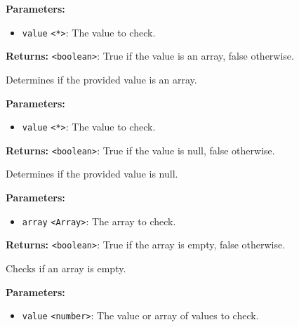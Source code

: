 \documentclass[12pt,a4paper]{article}
\begin{document}
\vspace{5mm}
\noindent {}


\noindent \textbf{Parameters:}
\begin{itemize}
  \item \texttt{value} \texttt{<*>}: The value to check.
\end{itemize}

\noindent \textbf{Returns:} \texttt{<boolean>}: True if the value is an array, false otherwise.

\noindent Determines if the provided value is an array.

\vspace{5mm}
\noindent {}


\noindent \textbf{Parameters:}
\begin{itemize}
  \item \texttt{value} \texttt{<*>}: The value to check.
\end{itemize}

\noindent \textbf{Returns:} \texttt{<boolean>}: True if the value is null, false otherwise.

\noindent Determines if the provided value is null.

\vspace{5mm}
\noindent {}


\noindent \textbf{Parameters:}
\begin{itemize}
  \item \texttt{array} \texttt{<Array>}: The array to check.
\end{itemize}

\noindent \textbf{Returns:} \texttt{<boolean>}: True if the array is empty, false otherwise.

\noindent Checks if an array is empty.

\vspace{5mm}
\noindent {}


\noindent \textbf{Parameters:}
\begin{itemize}
  \item \texttt{value} \texttt{<number>}: The value or array of values to check.
\end{itemize}
\end{document}
